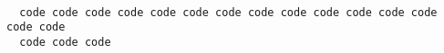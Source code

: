 \documentclass{article}
\begin{document}
\begin{verbatim}

  code code code code code code code code code code code code code code code
  code code code

\end{verbatim}
\end{document}
